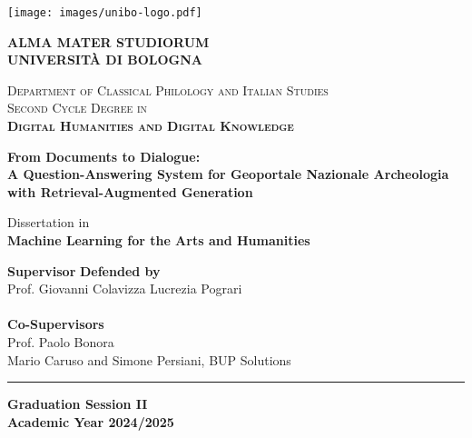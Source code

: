\documentclass[a4paper,12pt, openany]{book}  %
\begin{document}
\begin{titlepage}
    \centering
    \texttt{[image: images/unibo-logo.pdf]}
    
    \vspace*{1cm}
    \Large
    \textbf{ALMA MATER STUDIORUM \\ 
    UNIVERSITÀ DI BOLOGNA}
    
    
    \vspace{1.5cm}
    
    \normalsize
    \textsc{Department of Classical Philology and Italian Studies} \\
    \vspace{0.5cm}
    \textsc{Second Cycle Degree in} \\
    \vspace{0.2cm}
    \textsc{\textbf{Digital Humanities and Digital Knowledge}}
    
    \vspace{1.6cm}
    
    \begin{spacing}{1}
    \LARGE
    \textbf{From Documents to Dialogue:\\A Question-Answering System for Geoportale Nazionale Archeologia with Retrieval-Augmented Generation}
    \end{spacing}
    
    \vspace{1.2cm}
    \normalsize
    Dissertation in\\
    \textbf{Machine Learning for the Arts and Humanities}
    
    \vspace{1cm}
    
    \begin{tabbing}
    \textbf{Supervisor} \hspace{10cm} \= \textbf{Defended by} \\
    Prof. Giovanni Colavizza \> Lucrezia Pograri \\
    \\
    \textbf{Co-Supervisors}\\
    Prof. Paolo Bonora \\
    Mario Caruso and Simone Persiani, BUP Solutions
    \end{tabbing}
    
    \vfill
    \rule{\linewidth}{0.4pt}
    \vspace{0.2cm}
    
    \textbf{Graduation Session II} \\
    \textbf{Academic Year 2024/2025}
    
\end{titlepage}
\newpage
\thispagestyle{empty}  %
\mbox{}                %
\setcounter{figure}{0}
\end{document}
